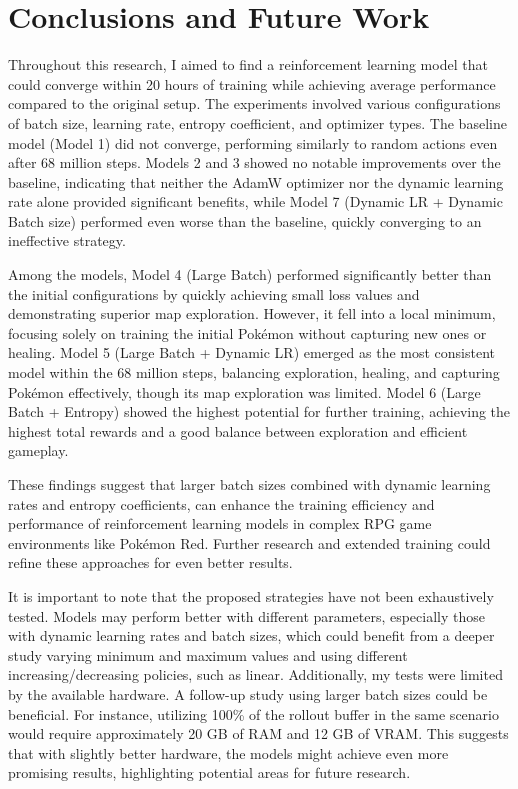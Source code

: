\documentclass[10pt,conference]{IEEEtran}
\begin{document}
\newpage



\section{Conclusions and Future Work}

Throughout this research, I aimed to find a reinforcement learning model that could converge within 20 hours of training while achieving average performance compared to the original setup. The experiments involved various configurations of batch size, learning rate, entropy coefficient, and optimizer types. The baseline model (Model 1) did not converge, performing similarly to random actions even after 68 million steps. Models 2 and 3 showed no notable improvements over the baseline, indicating that neither the AdamW optimizer nor the dynamic learning rate alone provided significant benefits, while Model 7 (Dynamic LR + Dynamic Batch size) performed even worse than the baseline, quickly converging to an ineffective strategy.

Among the models, Model 4 (Large Batch) performed significantly better than the initial configurations by quickly achieving small loss values and demonstrating superior map exploration. However, it fell into a local minimum, focusing solely on training the initial Pokémon without capturing new ones or healing. Model 5 (Large Batch + Dynamic LR) emerged as the most consistent model within the 68 million steps, balancing exploration, healing, and capturing Pokémon effectively, though its map exploration was limited. Model 6 (Large Batch + Entropy) showed the highest potential for further training, achieving the highest total rewards and a good balance between exploration and efficient gameplay. 

These findings suggest that larger batch sizes combined with dynamic learning rates and entropy coefficients, can enhance the training efficiency and performance of reinforcement learning models in complex RPG game environments like Pokémon Red. Further research and extended training could refine these approaches for even better results.

It is important to note that the proposed strategies have not been exhaustively tested. Models may perform better with different parameters, especially those with dynamic learning rates and batch sizes, which could benefit from a deeper study varying minimum and maximum values and using different increasing/decreasing policies, such as linear. Additionally, my tests were limited by the available hardware. A follow-up study using larger batch sizes could be beneficial. For instance, utilizing 100\% of the rollout buffer in the same scenario would require approximately 20 GB of RAM and 12 GB of VRAM. This suggests that with slightly better hardware, the models might achieve even more promising results, highlighting potential areas for future research.
\end{document}
